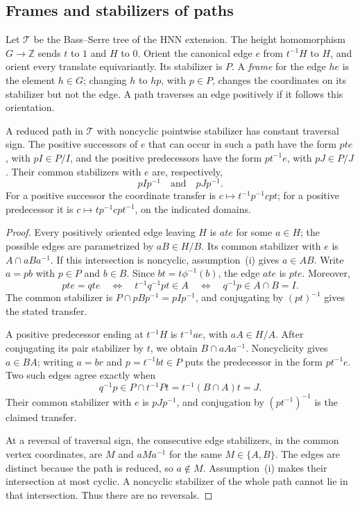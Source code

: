 \subsection{Frames and stabilizers of paths}

Let $\mathcal T$ be the Bass--Serre tree of the HNN extension.  The height
homomorphism $G\to\mathbb Z$ sends $t$ to $1$ and $H$ to $0$.  Orient
the canonical edge $e$ from $t^{-1}H$ to $H$, and orient every translate
equivariantly.  Its stabilizer is $P$.  A \emph{frame} for the edge $he$
is the element $h\in G$; changing $h$ to $hp$, with $p\in P$, changes
the coordinates on its stabilizer but not the edge.  A path traverses an
edge positively if it follows this orientation.

\begin{lemma}
\label{ann:frames}
A reduced path in $\mathcal T$ with noncyclic pointwise stabilizer has
constant traversal sign.  The positive successors of $e$ that can occur
in such a path have the form $pte$, with $pI\in P/I$, and the positive
predecessors have the form $pt^{-1}e$, with $pJ\in P/J$.  Their common
stabilizers with $e$ are, respectively,
\[
 pIp^{-1}\quad\text{and}\quad pJp^{-1}.
\]
For a positive successor the coordinate transfer is
$c\mapsto t^{-1}p^{-1}cpt$; for a positive predecessor it is
$c\mapsto tp^{-1}cpt^{-1}$, on the indicated domains.
\end{lemma}

\begin{proof}
Every positively oriented edge leaving $H$ is $ate$ for some $a\in H$;
the possible edges are parametrized by $aB\in H/B$.  Its common
stabilizer with $e$ is $A\cap aBa^{-1}$.  If this intersection is
noncyclic, assumption~\textup{(i)} gives $a\in AB$.  Write $a=pb$ with
$p\in P$ and $b\in B$.  Since $bt=t\phi^{-1}(b)$, the edge $ate$ is
$pte$.  Moreover,
\[
 pte=qte
 \quad\Longleftrightarrow\quad
 t^{-1}q^{-1}pt\in A
 \quad\Longleftrightarrow\quad q^{-1}p\in A\cap B=I.
\]
The common stabilizer is
$P\cap pBp^{-1}=pIp^{-1}$, and conjugating by $(pt)^{-1}$ gives
the stated transfer.

A positive predecessor ending at $t^{-1}H$ is $t^{-1}ae$, with
$aA\in H/A$.  After conjugating its pair stabilizer by $t$, we obtain
$B\cap aAa^{-1}$.  Noncyclicity gives $a\in BA$; writing $a=br$ and
$p=t^{-1}bt\in P$ puts the predecessor in the form $pt^{-1}e$.
Two such edges agree exactly when
\[
 q^{-1}p\in P\cap t^{-1}Pt
 =t^{-1}(B\cap A)t=J.
\]
Their common stabilizer with $e$ is $pJp^{-1}$, and conjugation by
$(pt^{-1})^{-1}$ is the claimed transfer.

At a reversal of traversal sign, the consecutive edge stabilizers, in
the common vertex coordinates, are $M$ and $aMa^{-1}$ for the same
$M\in\{A,B\}$.  The edges are distinct because the path is reduced, so
$a\notin M$.  Assumption~\textup{(i)} makes their intersection at most
cyclic.  A noncyclic stabilizer of the whole path cannot lie in that
intersection.  Thus there are no reversals.
\end{proof}

